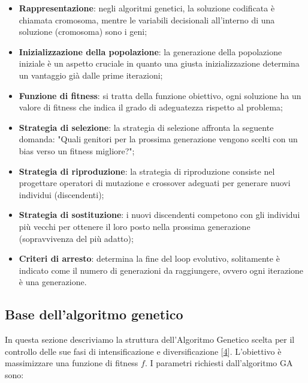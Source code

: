 \begin{itemize}
    \item \textbf{Rappresentazione}: negli algoritmi genetici, la soluzione codificata è chiamata cromosoma, mentre le variabili decisionali all'interno di una soluzione (cromosoma) sono i geni;
    
    \item \textbf{Inizializzazione della popolazione}: la generazione della popolazione iniziale è un aspetto cruciale in quanto una giusta inizializzazione determina un vantaggio già dalle prime iterazioni;
    
    \item \textbf{Funzione di fitness}: si tratta della funzione obiettivo, ogni soluzione ha un valore di fitness che indica il grado di adeguatezza rispetto al problema;
    
    \item \textbf{Strategia di selezione}: la strategia di selezione affronta la seguente domanda: "Quali genitori per la prossima generazione vengono scelti con un bias verso un fitness migliore?";
    
    \item \textbf{Strategia di riproduzione}: la strategia di riproduzione consiste nel progettare operatori di mutazione e crossover adeguati per generare nuovi individui (discendenti);
    
    \item \textbf{Strategia di sostituzione}: i nuovi discendenti competono con gli individui più vecchi per ottenere il loro posto nella prossima generazione (sopravvivenza del più adatto);
    
    \item \textbf{Criteri di arresto}: determina la fine del loop evolutivo, solitamente è indicato come il numero di generazioni da raggiungere, ovvero ogni iterazione è una generazione.
\end{itemize}

\subsection{Base dell'algoritmo genetico} \hypertarget{ga}{}

In questa sezione descriviamo la struttura dell'Algoritmo Genetico scelta per il controllo delle sue fasi di intensificazione e diversificazione [\hyperlink{bibliografia}{4}].
L'obiettivo è massimizzare una funzione di fitness $f$. I parametri richiesti dall'algoritmo GA sono:

